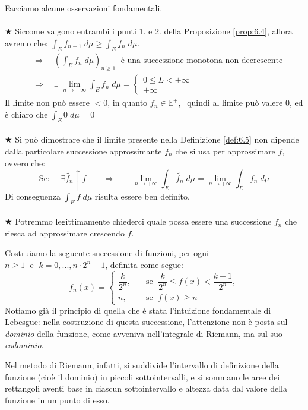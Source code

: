 \bigskip
\noindent Facciamo alcune osservazioni fondamentali.\\
\\
\(\bigstar\) Siccome valgono entrambi i punti 1. e 2. della Proposizione \ref{prop:6.4}, allora avremo che: $\int_E f_{n+1}\;d\mu\geq\int_E f_n\;d\mu$.
\begin{align*}
    &\Rightarrow\quad \left(\int_E f_n\;d\mu\right)_{n\geq1}\; \text{ è  una successione monotona non decrescente}\\
    &\Rightarrow\quad \exists\;\lim_{n\to+\infty}\int_E f_n\;d\mu = \begin{cases}
    0\leq L<+\infty\\
    +\infty
    \end{cases}
\end{align*} 
Il limite non può essere $<0$, in quanto $f_n\in\mathbb{E}^+, \;$ quindi al limite può valere $0$, ed è chiaro che $\int_E 0\;d\mu = 0$\\
\\
\(\bigstar\) Si può dimostrare che il limite presente nella Definizione \ref{def:6.5} non dipende dalla particolare successione approssimante $f_n$ che si usa per approssimare $f$, ovvero che:
\[\text{Se: }\quad \exists \tilde{f_n}\uparrow f\qquad\Rightarrow\qquad \lim_{n\to+\infty}\int_E \tilde{f_n}\;d\mu = \lim_{n\to+\infty}\int_E f_n\;d\mu\]
Di conseguenza $\int_E f\;d\mu$ risulta essere ben definito.\\
\\
\(\bigstar\) Potremmo legittimamente chiederci quale possa essere una successione $f_n$ che riesca ad approssimare crescendo $f$. 

\medskip
\noindent Costruiamo la seguente successione di funzioni, per ogni $n\geq1\;\text{ e } \;k = 0, ... , n\cdot2^n-1$, definita come segue:
\[
f_n(x) =
\begin{cases}
\dfrac{k}{2^n}, \quad & \text{se } \; \dfrac{k}{2^n} \le f(x) < \dfrac{k+1}{2^n},\\[6pt]
n, & \text{se } \;f(x) \ge n
\end{cases}
\]
Notiamo già il principio di quella che è stata l’intuizione fondamentale di 
Lebesgue: nella costruzione di questa successione, l’attenzione non è posta sul \textit{dominio} della funzione, come avveniva nell’integrale di Riemann, ma sul suo \textit{codominio}.

\medskip
\noindent Nel metodo di Riemann, infatti, si suddivide l’intervallo di definizione della funzione (cioè il dominio) in piccoli sottointervalli, e si sommano le aree dei rettangoli aventi base in ciascun sottointervallo e altezza data dal valore della funzione in un punto di esso.


